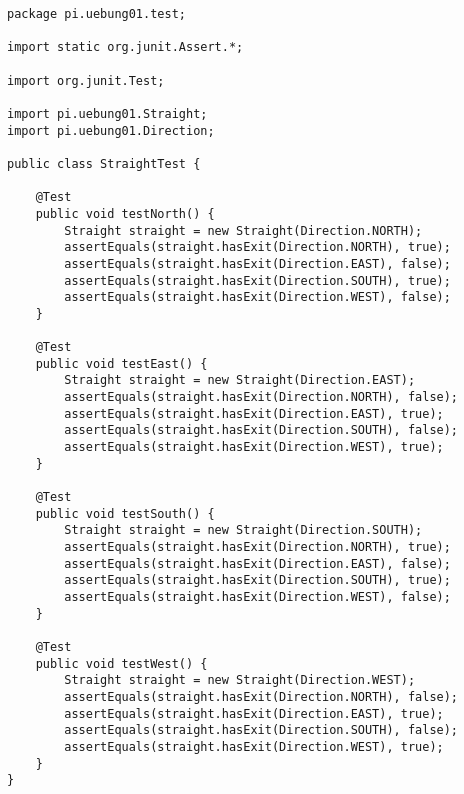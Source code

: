 \documentclass{pi2}
\begin{document}
\begin{lstlisting}
package pi.uebung01.test;

import static org.junit.Assert.*;

import org.junit.Test;

import pi.uebung01.Straight;
import pi.uebung01.Direction;

public class StraightTest {
	
	@Test
	public void testNorth() {
		Straight straight = new Straight(Direction.NORTH);
		assertEquals(straight.hasExit(Direction.NORTH), true);
		assertEquals(straight.hasExit(Direction.EAST), false);
		assertEquals(straight.hasExit(Direction.SOUTH), true);
		assertEquals(straight.hasExit(Direction.WEST), false);
	}
	
	@Test
	public void testEast() {
		Straight straight = new Straight(Direction.EAST);
		assertEquals(straight.hasExit(Direction.NORTH), false);
		assertEquals(straight.hasExit(Direction.EAST), true);
		assertEquals(straight.hasExit(Direction.SOUTH), false);
		assertEquals(straight.hasExit(Direction.WEST), true);
	}
	
	@Test
	public void testSouth() {
		Straight straight = new Straight(Direction.SOUTH);
		assertEquals(straight.hasExit(Direction.NORTH), true);
		assertEquals(straight.hasExit(Direction.EAST), false);
		assertEquals(straight.hasExit(Direction.SOUTH), true);
		assertEquals(straight.hasExit(Direction.WEST), false);
	}
	
	@Test
	public void testWest() {
		Straight straight = new Straight(Direction.WEST);
		assertEquals(straight.hasExit(Direction.NORTH), false);
		assertEquals(straight.hasExit(Direction.EAST), true);
		assertEquals(straight.hasExit(Direction.SOUTH), false);
		assertEquals(straight.hasExit(Direction.WEST), true);
	}
}

\end{lstlisting}
\end{document}
